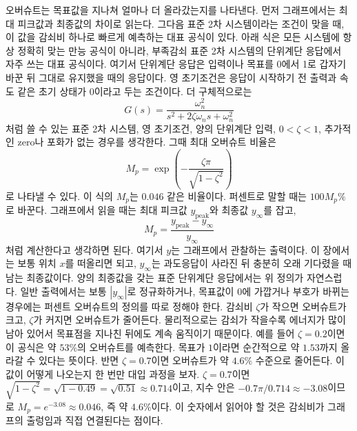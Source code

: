 오버슈트는 목표값을 지나쳐 얼마나 더 올라갔는지를 나타낸다.
먼저 그래프에서는 최대 피크값과 최종값의 차이로 읽는다.
그다음 표준 2차 시스템이라는 조건이 맞을 때, 이 값을 감쇠비 하나로 빠르게 예측하는 대표 공식이 있다.
아래 식은 모든 시스템에 항상 정확히 맞는 만능 공식이 아니라, 부족감쇠 표준 2차 시스템의 단위계단 응답에서 자주 쓰는 대표 공식이다.
여기서 단위계단 응답은 입력이나 목표를 0에서 1로 갑자기 바꾼 뒤 그대로 유지했을 때의 응답이다.
영 초기조건은 응답이 시작하기 전 출력과 속도 같은 초기 상태가 0이라고 두는 조건이다.
더 구체적으로는
\begin{equation}
  G(s)=\frac{\omega_n^2}{s^2+2\zeta\omega_n s+\omega_n^2}
\end{equation}
처럼 쓸 수 있는 표준 2차 시스템, 영 초기조건, 양의 단위계단 입력, $0<\zeta<1$, 추가적인 zero나 포화가 없는 경우를 생각한다.
그때 최대 오버슈트 비율은
\begin{equation}
  M_p
  =
  \exp\left(
  -\frac{\zeta\pi}{\sqrt{1-\zeta^2}}
  \right)
\end{equation}
로 나타낼 수 있다.
이 식의 $M_p$는 $0.046$ 같은 비율이다.
퍼센트로 말할 때는 $100M_p\%$로 바꾼다.
그래프에서 읽을 때는 최대 피크값 $y_{\mathrm{peak}}$와 최종값 $y_{\infty}$를 잡고,
\begin{equation}
  M_p=\frac{y_{\mathrm{peak}}-y_{\infty}}{y_{\infty}}
\end{equation}
처럼 계산한다고 생각하면 된다.
여기서 $y$는 그래프에서 관찰하는 출력이다.
이 장에서는 보통 위치 $x$를 떠올리면 되고, $y_{\infty}$는 과도응답이 사라진 뒤 충분히 오래 기다렸을 때 남는 최종값이다.
양의 최종값을 갖는 표준 단위계단 응답에서는 위 정의가 자연스럽다.
일반 출력에서는 보통 $|y_{\infty}|$로 정규화하거나, 목표값이 0에 가깝거나 부호가 바뀌는 경우에는 퍼센트 오버슈트의 정의를 따로 정해야 한다.
감쇠비 $\zeta$가 작으면 오버슈트가 크고, $\zeta$가 커지면 오버슈트가 줄어든다.
물리적으로는 감쇠가 작을수록 에너지가 많이 남아 있어서 목표점을 지나친 뒤에도 계속 움직이기 때문이다.
예를 들어 $\zeta=0.2$이면 이 공식은 약 $53\%$의 오버슈트를 예측한다.
목표가 $1$이라면 순간적으로 약 $1.53$까지 올라갈 수 있다는 뜻이다.
반면 $\zeta=0.7$이면 오버슈트가 약 $4.6\%$ 수준으로 줄어든다.
이 값이 어떻게 나오는지 한 번만 대입 과정을 보자.
$\zeta=0.7$이면 $\sqrt{1-\zeta^2}=\sqrt{1-0.49}=\sqrt{0.51}\approx0.714$이고, 지수 안은 $-0.7\pi/0.714\approx-3.08$이므로 $M_p=e^{-3.08}\approx0.046$, 즉 약 $4.6\%$이다.
%
이 숫자에서 읽어야 할 것은 감쇠비가 그래프의 출렁임과 직접 연결된다는 점이다.

